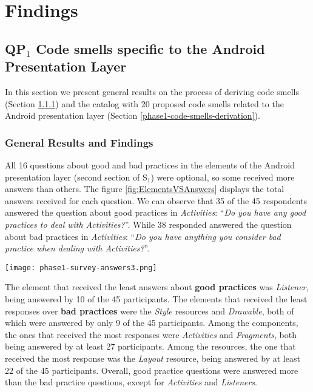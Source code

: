 \section{Findings}

\subsection{QP$_1$ Code smells specific to the Android Presentation Layer}
\label{phase1-results}

In this section we present general results on the process of deriving code smells (Section \ref{phase1-general-results}) and the catalog with 20 proposed code smells related to the Android presentation layer (Section \ref{phase1-code-smells-derivation}).

\subsubsection{General Results and Findings}
\label{phase1-general-results}

All 16 questions about good and bad practices in the elements of the Android presentation layer (second section of S$_1$) were optional, so some received more answers than others. The figure \ref{fig:ElementsVSAnswers} displays the total answers received for each question. We can observe that 35 of the 45 respondents answered the question about good practices in \textit{Activities}: ``\textit{Do you have any good practices to deal with Activities?}''. While 38 responded answered the question about bad practices in \textit{Activities}: ``\textit{Do you have anything you consider bad practice when dealing with Activities?}''.

\begin{figure*}[!htb]
\centering
\texttt{[image: phase1-survey-answers3.png]}
\caption{Total answers for each question about good and bad practices in the eight elements of the Android presentation layer.}
\label{fig:ElementsVSAnswers}
\end{figure*}

The element that received the least answers about \textbf{\small good practices} was \textit{Listener}, being answered by 10 of the 45 participants. The elements that received the least responses over \textbf{\small bad practices} were the \textit{Style} resources and \textit{Drawable}, both of which were answered by only 9 of the 45 participants. Among the components, the ones that received the most responses were \textit{Activities} and \textit{Fragments}, both being answered by at least 27 participants. Among the resources, the one that received the most response was the \textit{Layout} resource, being answered by at least 22 of the 45 participants. Overall, good practice questions were answered more than the bad practice questions, except for \textit{Activities} and \textit{Listeners}.

